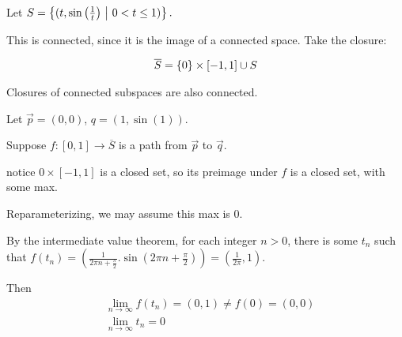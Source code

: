 \documentclass[12pt, twosided]{article}
\begin{document}
\begin{exa}\hspace{1em}

  \begin{center}
  \end{center}
  Let \(S = \left\{ (t, \sin\left(\frac{1}{t}\right) \ \middle\vert\  0 < t \leq 1) \right\}.\)

  This is connected, since it is the image of a connected space. Take the closure:

  \begin{align*}
    \overline{S} = \left\{ 0 \right\} \times [-1, 1] \cup S
  \end{align*}
\end{exa}

\begin{fact}
  Closures of connected subspaces are also connected.
\end{fact}

Let \(\vec{p} = (0, 0)\), \(q = (1, \sin(1))\).

Suppose \(f: [0,1] \to \overline{S}\) is a path from \(\vec{p}\) to \(\vec{q}\).

notice \(0 \times [-1, 1]\) is a closed set, so its preimage under \(f\) is a closed set, with some max.

Reparameterizing, we may assume this max is \(0\).

By the intermediate value theorem, for each integer \(n > 0\), there is some \(t_n\) such that \(f(t_n) = \left(\frac{1}{2\pi n + \frac{\pi}{2}}. \sin\left(2\pi n + \frac{\pi}{2}\right)\right) = \left(\frac{1}{2\pi}, 1\right) \).

Then
\begin{align*}
  &\lim_{n \to \infty} f(t_n) = (0, 1) \neq f(0) = (0, 0) \\
  &\lim_{n \to \infty} t_n = 0
\end{align*}
\end{document}
